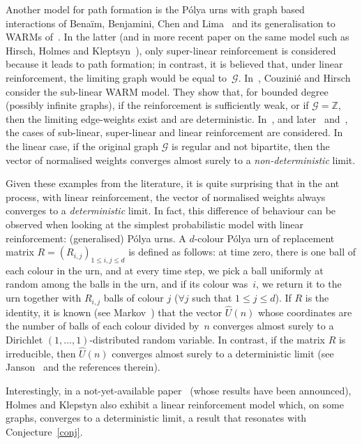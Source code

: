 \documentclass[10pt]{amsart}
\let\mathcal\mathscr
\numberwithin{equation}{section}
\theoremstyle{definition}
\begin{document}
Another model for path formation is the Pólya urns with graph based interactions
of Benaïm, Benjamini, Chen and Lima~\cite{BBCL}
and its generalisation to WARMs of~\cite{WARM}.
In the latter (and in more recent paper on the same model such as Hirsch, Holmes and Kleptsyn~\cite{WARM_new}),
only super-linear reinforcement is considered because it leads to path formation;
in contrast, it is believed that, under linear reinforcement,
the limiting graph would be equal to~$\mathcal G$.
{In~\cite{CH21}, Couzinié and Hirsch consider the sub-linear WARM model.
They show that, for bounded degree (possibly infinite graphs),
if the reinforcement is sufficiently weak, or if $\mathcal G = \mathbb Z$,
then the limiting edge-weights exist and are deterministic.}
In~\cite{BBCL}, and later~\cite{CL} and~\cite{Lima},
the cases of sub-linear, super-linear and linear reinforcement are considered.
In the linear case, if the original graph $\mathcal G$ is regular and not bipartite,
then the vector of normalised weights converges almost surely
to a \emph{non-deterministic} limit.

Given these examples from the literature, it is quite surprising that in the ant process, with linear
reinforcement, the vector of normalised weights always converges to a \emph{deterministic} limit.
In fact, this difference of behaviour can be observed when looking at the simplest probabilistic model with linear reinforcement: (generalised) Pólya urns.
A $d$-colour Pólya urn of replacement matrix $R = (R_{i,j})_{1\leq i,j\leq d}$ is defined as follows:
at time zero, there is one ball of each colour in the urn, and
at every time step, we pick a ball uniformly at random among the balls in the urn, and if its colour was~$i$, we return it to the urn together with $R_{i,j}$ balls of colour $j$ ($\forall j$  such that $1\leq j\leq d$).
If $R$ is the identity, it is known (see Markov~\cite{Markov}) that the vector $\hat U(n)$ whose coordinates are the number of balls of each colour divided by~$n$ converges almost surely to a Dirichlet $(1, \ldots, 1)$-distributed random variable.
In contrast, if the matrix $R$ is irreducible, then $\hat U(n)$ converges almost surely to a deterministic limit (see Janson~\cite{Janson04} and the references therein).

{Interestingly, in {a} not-yet-available paper~\cite{HK+} (whose results have been announced),
Holmes and Klepstyn also exhibit a linear reinforcement model which,
on some graphs, converges to a deterministic limit, a result that resonates with Conjecture~\ref{conj}.}
\end{document}
